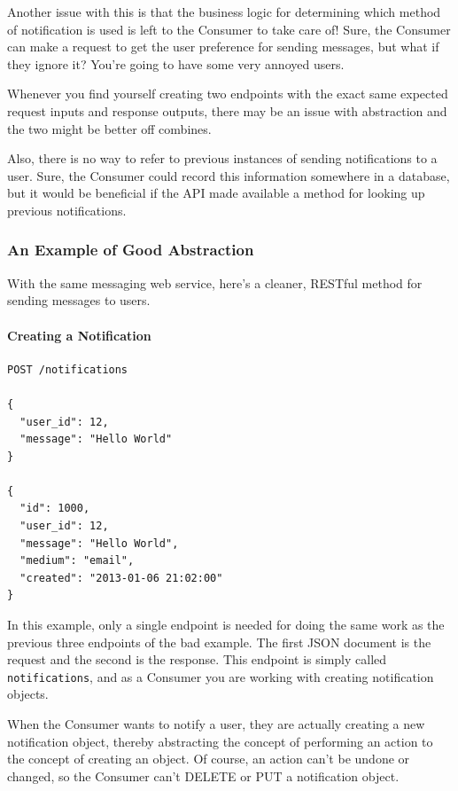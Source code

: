 \documentclass{book}
\begin{document}
Another issue with this is that the business logic for determining which method of notification is used is left to the Consumer to take care of! Sure, the Consumer can make a request to get the user preference for sending messages, but what if they ignore it? You're going to have some very annoyed users.

Whenever you find yourself creating two endpoints with the exact same expected request inputs and response outputs, there may be an issue with abstraction and the two might be better off combines.

Also, there is no way to refer to previous instances of sending notifications to a user. Sure, the Consumer could record this information somewhere in a database, but it would be beneficial if the API made available a method for looking up previous notifications.

\subsubsection{An Example of Good Abstraction}

With the same messaging web service, here's a cleaner, RESTful method for sending messages to users.

\paragraph{\textbf{Creating a Notification}}

\begin{verbatim}
POST /notifications

{
  "user_id": 12,
  "message": "Hello World"
}

{
  "id": 1000,
  "user_id": 12,
  "message": "Hello World",
  "medium": "email",
  "created": "2013-01-06 21:02:00"
}
\end{verbatim}

In this example, only a single endpoint is needed for doing the same work as the previous three endpoints of the bad example. The first JSON document is the request and the second is the response. This endpoint is simply called \texttt{notifications}, and as a Consumer you are working with creating notification objects.

When the Consumer wants to notify a user, they are actually creating a new notification object, thereby abstracting the concept of performing an action to the concept of creating an object. Of course, an action can't be undone or changed, so the Consumer can't DELETE or PUT a notification object.
\end{document}
